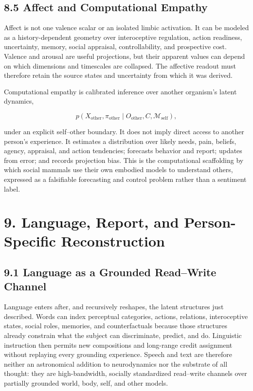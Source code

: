 \subsection{8.5 Affect and Computational Empathy}

Affect is not one valence scalar or an isolated limbic activation. It can be
modeled as a history-dependent geometry over interoceptive regulation, action
readiness, uncertainty, memory, social appraisal, controllability, and
prospective cost. Valence and arousal are useful projections, but their
apparent values can depend on which dimensions and timescales are collapsed.
The affective readout must therefore retain the source states and uncertainty
from which it was derived.

Computational empathy is calibrated inference over another organism's
latent dynamics,

\[
p(X_{\mathrm{other}},\pi_{\mathrm{other}}
\mid O_{\mathrm{other}},C,\mathcal{M}_{\mathrm{self}}),
\]

under an explicit self--other boundary. It does not imply direct access to
another person's experience. It estimates a distribution over likely needs,
pain, beliefs, agency, appraisal, and action tendencies; forecasts behavior
and report; updates from error; and records projection bias. This is the
computational scaffolding by which social mammals use their own embodied
models to understand others, expressed as a falsifiable forecasting and
control problem rather than a sentiment label.

\section{9. Language, Report, and Person-Specific Reconstruction}

\subsection{9.1 Language as a Grounded Read--Write Channel}

Language enters after, and recursively reshapes, the latent structures just
described. Words can index perceptual categories, actions, relations,
interoceptive states, social roles, memories, and counterfactuals because
those structures already constrain what the subject can discriminate,
predict, and do. Linguistic instruction then permits new compositions and
long-range credit assignment without replaying every grounding experience.
Speech and text are therefore neither an astronomical addition to
neurodynamics nor the substrate of all thought: they are high-bandwidth,
socially standardized read--write channels over partially grounded world,
body, self, and other models.

